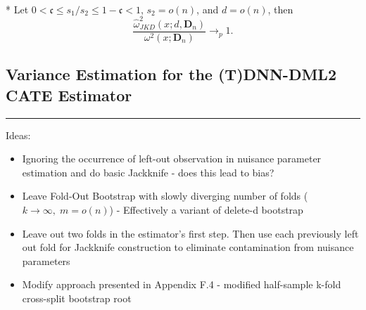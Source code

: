 \begin{boxD}
	\begin{thm}\label{thm:JKD_Cons}\mbox{}\\*
		Let $0 < \mathfrak{c} \leq s_1/s_2 \leq 1 - \mathfrak{c} < 1$, $s_2 = o(n)$, and $d = o(n)$, then
		\begin{equation}
			\frac{\hat{\omega}_{JKD}^2\left(x; d, \mathbf{D}_n\right)}{\omega^{2}\left(x; \mathbf{D}_n\right)} \longrightarrow_{p} 1.
		\end{equation}
	\end{thm}
\end{boxD}

\subsection{Variance Estimation for the (T)DNN-DML2 CATE Estimator}\label{CATE_Var_Ests}
\hrule

{\color{red}
Ideas:
\begin{itemize}
	\item Ignoring the occurrence of left-out observation in nuisance parameter estimation and do basic Jackknife - does this lead to bias?
	\item Leave Fold-Out Bootstrap with slowly diverging number of folds ($k \rightarrow \infty, \;m = o(n)$) - Effectively a variant of delete-d bootstrap
	\item Leave out two folds in the estimator's first step. 
	Then use each previously left out fold for Jackknife construction to eliminate contamination from nuisance parameters
	\item Modify approach presented in \citet{ritzwoller_uniform_2024} Appendix F.4 - modified half-sample k-fold cross-split bootstrap root
\end{itemize}
}

